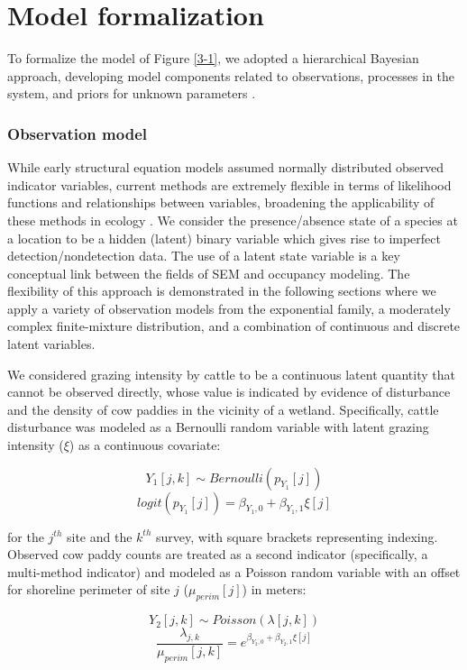 \section{Model formalization}

To formalize the model of Figure \ref{3-1}, we adopted a hierarchical Bayesian
approach, developing model components related to observations, processes
in the system, and priors for unknown parameters \citep{Lee2007b, Cressie2009, Dorazio2010}.

\subsubsection{Observation model}

While early structural equation models assumed normally distributed
observed indicator variables, current methods are extremely flexible in
terms of likelihood functions and relationships between variables,
broadening the applicability of these methods in ecology \citep{Grace2006, Lee2007b}.
We consider the presence/absence state of a species at a
location to be a hidden (latent) binary variable which gives rise to
imperfect detection/nondetection data. The use of a latent state
variable is a key conceptual link between the fields of SEM and
occupancy modeling. The flexibility of this approach is demonstrated in
the following sections where we apply a variety of observation models
from the exponential family, a moderately complex finite-mixture
distribution, and a combination of continuous and discrete latent
variables.

We considered grazing intensity by cattle to be a continuous latent
quantity that cannot be observed directly, whose value is indicated by
evidence of disturbance and the density of cow paddies in the vicinity
of a wetland. Specifically, cattle disturbance was modeled as a
Bernoulli random variable with latent grazing intensity ($\xi$) as a
continuous covariate:

\[ Y_1[j, k] \sim Bernoulli(p_{Y_1}[j]) \]
\[ logit(p_{Y_1}[j]) = \beta_{Y_1, 0} + \beta_{Y_1, 1} \xi[j] \]

for the $j^{th}$ site and the $k^{th}$ survey, with square brackets
representing indexing. Observed cow paddy counts are treated as a second
indicator (specifically, a multi-method indicator) \citep{Grace2006} and
modeled as a Poisson random variable with an offset for shoreline
perimeter of site $j$ ($\mu_{perim}[j]$) in meters:

\[ Y_2[j, k] \sim Poisson(\lambda[j, k]) \]
\[ \dfrac{\lambda_{j, k}}{\mu_{perim}[j, k]} = e^{\beta_{Y_2, 0} + \beta_{Y_2, 1} \xi[j]} \]

